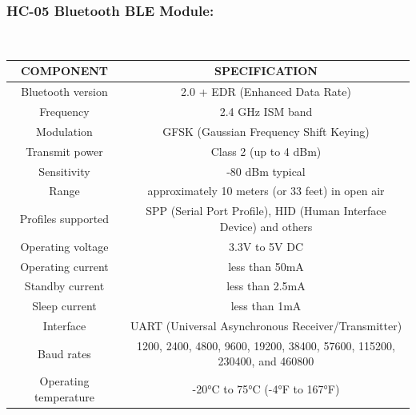 \documentclass[12pt]{article}
\begin{document}
\subsubsection{HC-05 Bluetooth BLE Module:}
\\
\begin{tabular}{|c|c|}
    \hline
     COMPONENT & SPECIFICATION  \\
    \hline
     Bluetooth version & 2.0 + EDR (Enhanced Data Rate) \\
     \hline
     Frequency & 2.4 GHz ISM band \\
     \hline
     Modulation & GFSK (Gaussian Frequency Shift Keying) \\
     \hline
     Transmit power & Class 2 (up to 4 dBm) \\
     \hline
    Sensitivity & -80 dBm typical \\
    \hline 
    Range & approximately 10 meters (or 33 feet) in open air \\
    \hline
    Profiles supported & SPP (Serial Port Profile), HID (Human Interface Device) and others \\
    \hline
    Operating voltage & 3.3V to 5V DC \\
    \hline
    Operating current & less than 50mA \\
    \hline
    Standby current & less than 2.5mA \\
    \hline
    Sleep current& less than 1mA \\
    \hline
    Interface&  UART (Universal Asynchronous Receiver/Transmitter) \\
    \hline
    Baud rates& 1200, 2400, 4800, 9600, 19200, 38400, 57600, 115200, 230400, and 460800 \\
    \hline
    Operating temperature& -20°C to 75°C (-4°F to 167°F) \\
    \hline
\end{tabular}
\end{document}
